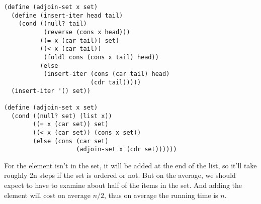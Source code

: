 \documentclass[a4paper,12pt]{article}
\begin{document}
\begin{lstlisting}
(define (adjoin-set x set)
  (define (insert-iter head tail)
    (cond ((null? tail)
           (reverse (cons x head)))
          ((= x (car tail)) set)
          ((< x (car tail))
           (foldl cons (cons x tail) head))
          (else
           (insert-iter (cons (car tail) head)
                        (cdr tail)))))
  (insert-iter '() set))

(define (adjoin-set x set)
  (cond ((null? set) (list x))
        ((= x (car set)) set)
        ((< x (car set)) (cons x set))
        (else (cons (car set)
                    (adjoin-set x (cdr set))))))
\end{lstlisting}
For the element isn't in the set, it will be added at the end of the
list, so it'll take roughly 2n steps if the set is ordered or not.
But on the average, we should expect to have to examine about half of
the items in the set.   And adding the element will cost on average
$n/2$, thus on average the running time is $n$.
\end{document}
